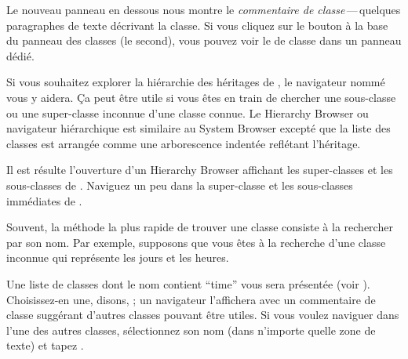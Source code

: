 \documentclass[a4paper,10pt,twoside]{book}
\begin{document}
Le nouveau panneau en dessous nous montre le \emph{commentaire de
  classe}\,---\,quelques paragraphes de texte d\'ecrivant la classe.
Si vous cliquez sur le bouton  \`a la base du panneau des
classes 
(\cad le second),
vous pouvez voir le  de classe dans un
panneau d\'edi\'e.


Si vous souhaitez explorer la hi\'erarchie des h\'eritages de \sq, le
navigateur nomm\'e  vous y aidera.
Ça peut \^etre utile si vous \^etes en train de chercher une
sous-classe ou une super-classe inconnue d'une classe connue.
Le Hierarchy Browser ou navigateur hi\'erarchique est similaire au System Browser except\'e que la liste des classes est arrang\'ee comme
une arborescence indent\'ee refl\'etant l'h\'eritage.

\noindent
Il est r\'esulte l'ouverture d'un Hierarchy Browser affichant les
super-classes et les sous-classes de .
Naviguez un peu dans la super-classe et les sous-classes imm\'ediates
de .

Souvent, la m\'ethode la plus rapide de trouver une classe consiste
\`a la rechercher par son nom. Par exemple, supposons que vous \^etes
\`a la recherche d'une classe inconnue qui repr\'esente les jours et
les heures.%

\noindent
Une liste de classes dont le nom contient ``time'' vous sera
pr\'esent\'ee (voir ). Choisissez-en une, disons,
; 
un navigateur l'affichera avec un commentaire de classe
sugg\'erant d'autres classes pouvant \^etre utiles. Si vous voulez
naviguer dans l'une des autres classes, s\'electionnez son nom (dans
n'importe quelle zone de texte) et tapez .
\end{document}
